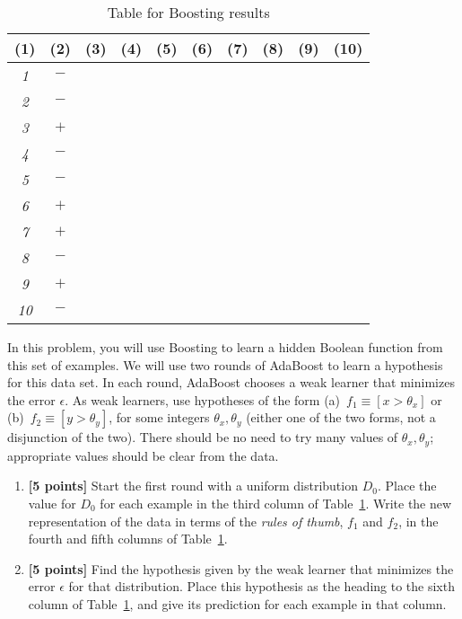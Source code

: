 \begin{enumerate}
\begin{table}[!t]
{\begin{tabular}{|c|c||c|c|c|c||c|c|c|c|}
          \tiny{(1)} & \tiny{(2)} & \tiny{(3)} & \tiny{(4)} &  \tiny{(5)} & \tiny{(6)} & \tiny{(7)} & \tiny{(8)} & \tiny{(9)} & \tiny{(10)}\\
          \hline \hline
          {\em 1} & $-$ & & & & & & & &  \\
          \hline
          {\em 2} & $-$ & & & & & & & &  \\
          \hline
          {\em 3} & $+$ & & & & & & & & \\
          \hline
          {\em 4} & $-$ & & & & & & & & \\
          \hline
          {\em 5} & $-$ & & & & & & & & \\
          \hline
          {\em 6} & $+$ & & & & & & & & \\
          \hline
          {\em 7} & $+$ & & & & & & & & \\
          \hline
          {\em 8} & $-$ & & & & & & & & \\
          \hline
          {\em 9} & $+$ & & & & & & & & \\
          \hline
          {\em 10} & $-$ & & & & & & & & \\
          \hline
        \end{tabular}
        \caption{Table for Boosting results}\label{table:ltu}}
    \end{table}


  In this problem, you will use Boosting to learn a hidden Boolean function from this set of examples.
We will use two rounds of AdaBoost to learn a hypothesis for this
    data set. In each round, AdaBoost chooses a weak learner that minimizes the error $\epsilon$. As weak learners, use hypotheses of the form (a)~$f_1 \equiv [x
    > \theta_x]$ or (b)~$f_2 \equiv [y > \theta_y]$, for some integers $\theta_x, \theta_y$ (either one of the two forms, not a disjunction of the two). There should be no need to try many values of $\theta_x, \theta_y$;
    appropriate values should be clear from the data.


  \begin{enumerate}
  \item {\bf [5 points]}  Start the first round with a uniform distribution $D_0$.  Place the value for
    $D_0$ for each example in the third column of Table~\ref{table:ltu}.
Write the new representation of the data in terms of the {\em rules of thumb}, $f_1$ and $f_2$, in the fourth and fifth columns of Table~\ref{table:ltu}.

  \item {\bf [5 points]}
    Find the hypothesis given by the weak learner that minimizes the error
    $\epsilon$ for that distribution.  Place this hypothesis as the heading to the
    sixth column of Table~\ref{table:ltu}, and give its prediction for each example in that column.


\end{enumerate}
\end{enumerate}
